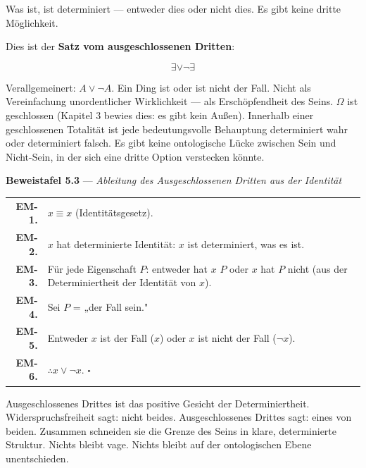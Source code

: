 \documentclass[10pt, openany, oneside]{book}
\renewcommand{\footnotesize}{\fontsize{8.5}{11}\selectfont}
\begin{document}
\vspace{1em}

\noindent Was ist, ist determiniert --- entweder dies oder nicht dies. Es gibt keine dritte Möglichkeit.

Dies ist der \textbf{Satz vom ausgeschlossenen Dritten}:

$$\exists \vee \neg\exists$$

Verallgemeinert: $A \vee \neg A$. Ein Ding ist oder ist nicht der Fall. Nicht als Vereinfachung unordentlicher Wirklichkeit --- als Erschöpfendheit des Seins. $\Omega$ ist geschlossen (Kapitel 3 bewies dies: es gibt kein Außen). Innerhalb einer geschlossenen Totalität ist jede bedeutungsvolle Behauptung determiniert wahr oder determiniert falsch. Es gibt keine ontologische Lücke zwischen Sein und Nicht-Sein, in der sich eine dritte Option verstecken könnte.

\vspace{0.5em}

\textbf{Beweistafel 5.3} --- \textit{Ableitung des Ausgeschlossenen Dritten aus der Identität}

\vspace{0.5em}

{\footnotesize
\noindent\begin{tabular}{r p{}}
\textbf{EM-1.} & $x \equiv x$ (Identitätsgesetz). \\[0.3em]
\textbf{EM-2.} & $x$ hat determinierte Identität: $x$ ist determiniert, was es ist. \\[0.3em]
\textbf{EM-3.} & Für jede Eigenschaft $P$: entweder hat $x$ $P$ oder $x$ hat $P$ nicht (aus der Determiniertheit der Identität von $x$). \\[0.3em]
\textbf{EM-4.} & Sei $P$ = „der Fall sein." \\[0.3em]
\textbf{EM-5.} & Entweder $x$ ist der Fall ($x$) oder $x$ ist nicht der Fall ($\neg x$). \\[0.3em]
\textbf{EM-6.} & $\therefore x \vee \neg x$. $\square$ \\[0.3em]
\end{tabular}
}

\vspace{0.8em}

\noindent Ausgeschlossenes Drittes ist das positive Gesicht der Determiniertheit. Widerspruchsfreiheit sagt: nicht beides. Ausgeschlossenes Drittes sagt: eines von beiden. Zusammen schneiden sie die Grenze des Seins in klare, determinierte Struktur. Nichts bleibt vage. Nichts bleibt auf der ontologischen Ebene unentschieden.
\end{document}
